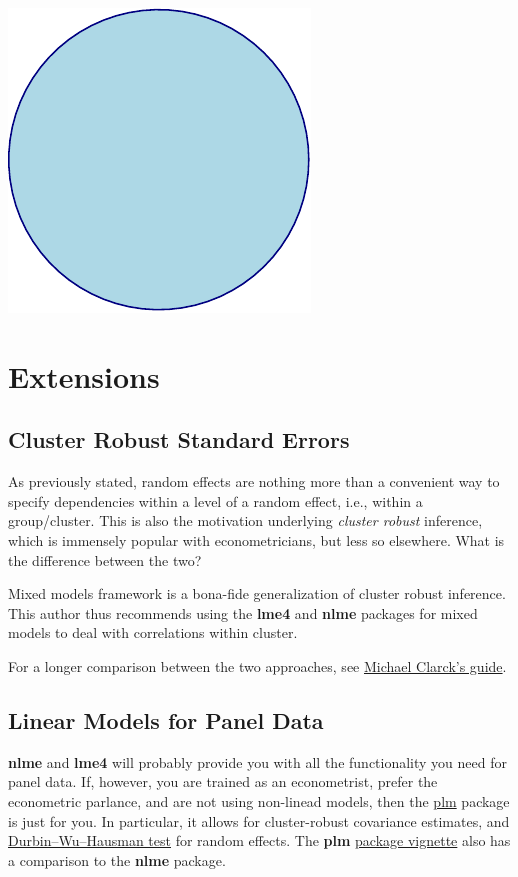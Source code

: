 \documentclass[]{book}
\theoremstyle{definition}
\theoremstyle{definition}
\theoremstyle{definition}
\theoremstyle{remark}
\begin{document}
\includegraphics[width=0.5\linewidth]{Rcourse_files/figure-latex/unnamed-chunk-218-1}

\section{Extensions}\label{extensions-1}

\subsection{Cluster Robust Standard
Errors}\label{cluster-robust-standard-errors}

As previously stated, random effects are nothing more than a convenient
way to specify dependencies within a level of a random effect, i.e.,
within a group/cluster. This is also the motivation underlying
\emph{cluster robust} inference, which is immensely popular with
econometricians, but less so elsewhere. What is the difference between
the two?

Mixed models framework is a bona-fide generalization of cluster robust
inference. This author thus recommends using the \textbf{lme4} and
\textbf{nlme} packages for mixed models to deal with correlations within
cluster.

For a longer comparison between the two approaches, see
\href{https://m-clark.github.io/docs/clustered/}{Michael Clarck's
guide}.

\subsection{Linear Models for Panel
Data}\label{linear-models-for-panel-data}

\textbf{nlme} and \textbf{lme4} will probably provide you with all the
functionality you need for panel data. If, however, you are trained as
an econometrist, prefer the econometric parlance, and are not using
non-linead models, then the
\href{https://cran.r-project.org/package=plm}{plm} package is just for
you. In particular, it allows for cluster-robust covariance estimates,
and
\href{https://en.wikipedia.org/wiki/Durbin\%E2\%80\%93Wu\%E2\%80\%93Hausman_test}{Durbin--Wu--Hausman
test} for random effects. The \textbf{plm}
\href{https://cran.r-project.org/web/packages/plm/vignettes/plm.pdf}{package
vignette} also has a comparison to the \textbf{nlme} package.
\end{document}
